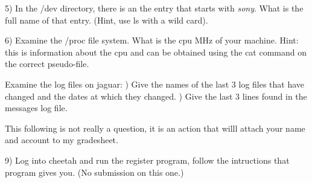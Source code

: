 5) In the {\ltt{}/dev} directory, there is an the entry that starts
with {\it sony}. What is the full name of that entry.
(Hint, use ls with a wild card).

6) Examine the {\ltt{}/proc} file system.
What is the cpu MHz of your machine.
Hint: this is information about the cpu and can be obtained using the
cat command on the correct pseudo-file.

Examine the log files on {\ltt{}jaguar}:
\hfill{}) Give the names of the last 3 log files that have changed and 
the dates at which they changed.
\hfill{}) Give the last 3 lines found in the {\ltt{}messages} log file.

This following is not really a question, it is an action that
willl attach your name and account to my gradesheet.

9) Log into {\ltt{}cheetah} and run the {\ltt{}register} program,
follow the intructions that program gives you.
(No submission on this one.)

\bye
